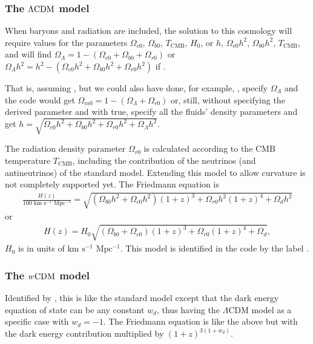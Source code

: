 \documentclass[letterpaper,12pt,english]{sphinxhowto}
\begin{document}
\subsubsection{The \protect\(\Lambda\text{CDM}\protect\) model}
\label{\detokenize{themodels:the-model}}
When baryons and radiation are included, the solution to this cosmology will
require values for the parameters
\(\Omega_{c0}\),
\(\Omega_{b0}\),
\(T_{\text{CMB}}\),
\(H_0\),
or
\(h\),
\(\Omega_{c0} h^2\),
\(\Omega_{b0} h^2\),
\(T_{\text{CMB}}\),
and will find \(\Omega_{\Lambda} = 1 - \left( \Omega_{c0} + \Omega_{b0} + \Omega_{r0} \right)\) or
\(\Omega_{\Lambda} h^2 = h^2 - \left( \Omega_{c0} h^2 + \Omega_{b0} h^2 + \Omega_{r0} h^2 \right)\)
if . %
\begin{footnote}[1]\sphinxAtStartFootnote
That is, assuming , but we could also have done, for example, , specify \(\Omega_{\Lambda}\) and the code would get \(\Omega_{m0} = 1 - \left( \Omega_{\Lambda} + \Omega_{r0} \right)\) or, still, without specifying the derived parameter and with  true, specify all the fluids’  density parameters and get \(h = \sqrt{\Omega_{c0} h^2 + \Omega_{b0} h^2 + \Omega_{r0} h^2 + \Omega_{\Lambda} h^2}\).
%
\end{footnote}
The radiation density parameter \(\Omega_{r0}\) is calculated according to
the CMB temperature \(T_{\text{CMB}}\), including the contribution of the
neutrinos (and antineutrinos) of the standard model.
Extending this model to allow curvature is not completely supported yet. The
Friedmann equation is
\begin{equation*}
\begin{split}\frac{H(z)}{100 \,\, \text{km s$^{-1}$ Mpc$^{-1}$}} = \sqrt{ (\Omega_{b0} h^2 + \Omega_{c0} h^2) (1+z)^3 + \Omega_{r0} h^2 (1+z)^4 + \Omega_d h^2}\end{split}
\end{equation*}
or
\begin{equation*}
\begin{split}H(z) = H_0 \sqrt{ (\Omega_{b0} + \Omega_{c0})  (1+z)^3 + \Omega_{r0} (1+z)^4 + \Omega_d},\end{split}
\end{equation*}
\(H_0\) is in units of \(\text{km s$^{-1}$ Mpc$^{-1}$}\).
This model is identified in the code by the label .


\subsubsection{The \protect\(w\text{CDM}\protect\) model}
\label{\detokenize{themodels:id2}}
Identified by , this is like the standard model except that the dark
energy equation of state can be any constant \(w_d\), thus having the
\(\Lambda\text{CDM}\) model as a specific case with \(w_d = -1\).
The Friedmann equation is like the above but with the dark energy contribution
multiplied by \((1+z)^{3(1+w_d)}\).
\end{document}
